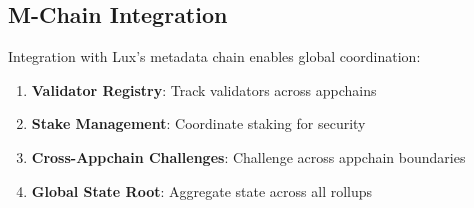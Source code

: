 \subsection{M-Chain Integration}

Integration with Lux's metadata chain enables global coordination:

\begin{enumerate}
    \item \textbf{Validator Registry}: Track validators across appchains
    \item \textbf{Stake Management}: Coordinate staking for security
    \item \textbf{Cross-Appchain Challenges}: Challenge across appchain boundaries
    \item \textbf{Global State Root}: Aggregate state across all rollups
\end{enumerate}

